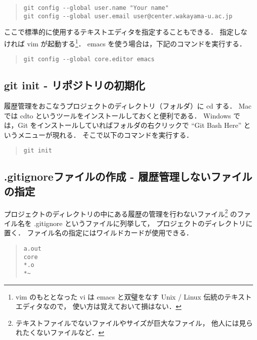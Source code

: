 \documentclass[a4j,10pt]{jarticle}
\begin{document}
\begin{quote}
\begin{verbatim}
git config --global user.name "Your name"
git config --global user.email user@center.wakayama-u.ac.jp
\end{verbatim}
\end{quote}

ここで標準的に使用するテキストエディタを指定することもできる．
指定しなければ vim が起動する\footnote{vim のもととなった vi は
emacs と双璧をなす Unix / Linux 伝統のテキストエディタなので，
使い方は覚えておいて損はない．}．
emacs を使う場合は，下記のコマンドを実行する．

\begin{quote}
\begin{verbatim}
git config --global core.editor emacs
\end{verbatim}
\end{quote}

\subsection{git init - リポジトリの初期化}
履歴管理をおこなうプロジェクトのディレクトリ（フォルダ）に cd する．
Mac では cdto というツールをインストールしておくと便利である．
Windows では，Git をインストールしていればフォルダの右クリックで
``Git Bash Here'' というメニューが現れる．
そこで以下のコマンドを実行する．

\begin{quote}
\begin{verbatim}
git init
\end{verbatim}
\end{quote}

\subsection{.gitignoreファイルの作成 - 履歴管理しないファイルの指定}
プロジェクトのディレクトリの中にある履歴の管理を行わないファイル\footnote{
テキストファイルでないファイルやサイズが巨大なファイル，
他人には見られたくないファイルなど．}
のファイル名を .gitignore というファイルに列挙して，
プロジェクトのディレクトリに置く．
ファイル名の指定にはワイルドカードが使用できる．

\begin{quote}
\begin{verbatim}
a.out
core
*.o
*~
\end{verbatim}
\end{quote}
\end{document}

